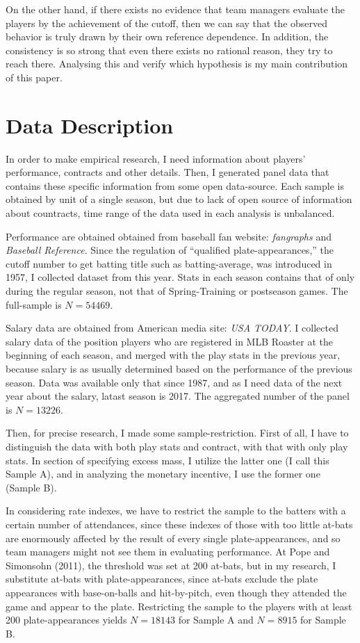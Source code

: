 \documentclass[dvipdfmx, 12pt]{article}
\begin{document}
  On the other hand, if there exists no evidence that team managers evaluate the players by the achievement of the cutoff, then we can say that the observed behavior is truly drawn by their own reference dependence. In addition, the consistency is so strong that even there exists no rational reason, they try to reach there. Analysing this and verify which hypothesis is my main contribution of this paper.

\section{Data Description}

In order to make empirical research, I need information about players' performance, contracts and other details. Then, I generated panel data that contains these specific information from some open data-source. Each sample is obtained by unit of a single season, but due to lack of open source of information about countracts, time range of the data used in each analysis is unbalanced.

Performance are obtained obtained from baseball fan website:  \textit{fangraphs} and \textit{Baseball Reference}. Since the regulation of ``qualified plate-appearances,'' the cutoff number to get batting title such as batting-average, was introduced in 1957, I collected dataset from this year. Stats in each season contains that of only during the regular season, not that of Spring-Training or postseason games. The full-sample is $N=54469$.

Salary data are obtained from American media site: \textit{USA TODAY}. I collected salary data of the position players who are registered in MLB Roaster at the beginning of each season, and merged with the play stats in the previous year, because salary is as usually determined based on the performance of the previous season. Data was available only that since 1987, and as I need data of the next year about the salary, latast season is 2017. The aggregated number of the panel is $N=13226$.

Then, for precise research, I made some sample-restriction. First of all, I have to distinguish the data with both play stats and contract, with that with only play stats. In section of specifying excess mass, I utilize the latter one (I call this Sample A), and in analyzing the monetary incentive, I use the former one (Sample B).

In considering rate indexes, we have to restrict the sample to the batters with a certain number of attendances, since these indexes of those with too little at-bats are enormously affected by the result of every single plate-appearances, and so team managers might not see them in evaluating performance. At Pope and Simonsohn (2011), the threshold was set at 200 at-bats, but in my research, I substitute at-bats with plate-appearances, since at-bats exclude the plate appearances with base-on-balls and hit-by-pitch, even though they attended the game and appear to the plate. Restricting the sample to the players with at least 200 plate-appearances yields $N=18143$ for Sample A and $N=8915$ for Sample B.
\end{document}
